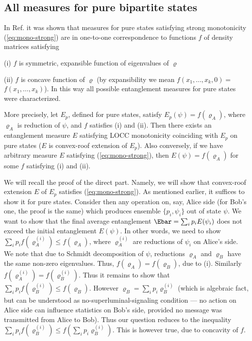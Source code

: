 \documentclass[twocolumn,aps,rmp]{revtex4}
\begin{document}
\subsection{All measures for pure bipartite states}
\label{subsec:all-pure}

In Ref. \cite{Vidal-mon2000} it was shown that measures for pure states
satisfying strong monotonicity (\ref{eq:mono-strong}) are in
one-to-one correspondence to functions $f$ of density matrices satisfying
\bei
\item[(i)] $f$ is symmetric, expansible function of eigenvalues of $\varrho$
\item[(ii)] $f$ is concave function of $\varrho$
\eei
(by expansibility we mean $f(x_1,\ldots,x_k,0)=$ $f(x_1,\ldots,x_k)$).
In this way all possible entanglement measures for pure  states were characterized.

More precisely, let $E_p$, defined for pure states,
satisfy $E_p(\psi)=f(\varrho_A)$, where $\varrho_A$ is reduction of $\psi$,
and $f$ satisfies (i) and (ii). Then there exists an entanglement  measure $E$
satisfying LOCC monotonicity coinciding with $E_p$ on pure states ($E$ is convex-roof
extension of $E_p$). Also conversely, if we have arbitrary measure
$E$ satisfying  (\ref{eq:mono-strong}), then  $E(\psi)=f(\varrho_A)$ for
some $f$ satisfying (i) and (ii).

We will recall the proof of the direct part. Namely, we will show
that convex-roof extension $E$ of $E_p$ satisfies
(\ref{eq:mono-strong}). As mentioned earlier, it suffices to show it
for pure states. Consider then any operation on, say, Alice side
(for Bob's one, the proof is the same) which produces ensemble
$\{p_i,\psi_i\}$ out of state $\psi$. We want to show that the final
average entanglement $\Ebar=\sum_ip_iE(\psi_i)$ does not exceed the
initial entanglement $E(\psi)$. In other words, we need to show
$\sum_ip_i f(\varrho_A^{(i)})\leq f(\varrho_A)$, where
$\varrho_A^{(i)}$ are reductions of $\psi_i$ on Alice's side.  We
note that due to Schmidt decomposition of $\psi$, reductions
$\varrho_A$ and $\varrho_B$ have the same non-zero eigenvalues.
Thus, $f(\varrho_A) =f(\varrho_B)$, due to (i). Similarly
$f(\varrho_A^{(i)})= f(\varrho_B^{(i)})$. Thus it remains to show
that $\sum_ip_i f(\varrho_B^{(i)})\leq f(\varrho_B)$. However
$\varrho_B= \sum_ip_i\varrho_B^{(i)}$ (which is algebraic fact, but
can be understood as no-superluminal-signaling condition --- no action
on Alice side can influence statistics on Bob's side, provided  no
message was transmitted from Alice to Bob). Thus our question
reduces to the inequality $\sum_ip_i f(\varrho_B^{(i)})\leq
f(\sum_ip_i\varrho_B^{(i)})$. This is however true, due to concavity
of $f$.
\end{document}
